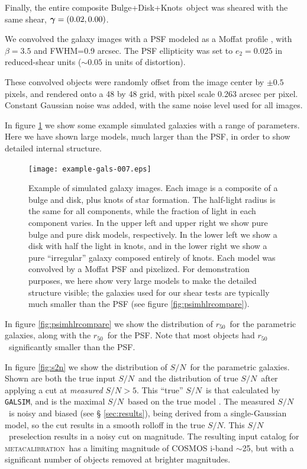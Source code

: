 \documentclass[iop]{emulateapj}
\newcommand{\snr}{$S/N$}
\newcommand{\hlr}{$r_{50}$}
\newcommand{\vecg}{\mbox{\boldmath $\gamma$}}
\newcommand{\mcal}{\textsc{metacalibration}}
\newcommand{\bdkfull}{Bulge+Disk+Knots}
\newcommand{\galsim}{\texttt{GALSIM}}
\begin{document}
Finally, the entire composite \bdkfull\ object was sheared with the same
shear, $\vecg = (0.02, 0.00)$.

We convolved the galaxy images with a PSF modeled as a Moffat profile
\citep{Moffat1969}, with $\beta=3.5$ and FWHM=0.9 arcsec. The PSF ellipticity
was set to $e_2 = 0.025$ in reduced-shear units ($\sim0.05$ in units of
distortion). 

These convolved objects were randomly offset from the image center by $\pm 0.5$
pixels, and rendered onto a 48 by 48 grid, with pixel scale 0.263 arcsec per
pixel. Constant Gaussian noise was added, with the same noise level used for
all images. 

In figure \ref{fig:parametricgals} we show some example simulated galaxies with
a range of parameters.  Here we have shown large models, much larger than the
PSF, in order to show detailed internal structure.

\begin{figure}[p]
    \centering
    \texttt{[image: example-gals-007.eps]}

    \caption{Example of simulated galaxy images.  Each image is a composite of a
    bulge and disk, plus knots of star formation.  The half-light radius is the
    same for all components, while the fraction of light in each component
    varies.  In the upper left and upper right we show pure bulge and pure disk
    models, respectively.  In the lower left we show a disk with half the light
    in knots, and in the lower right we show a pure ``irregular'' galaxy
    composed entirely of knots.  Each model was convolved by a Moffat PSF
	and pixelized.  For demonstration purposes, we here show very
    large models to make the detailed structure visible; the galaxies used for
    our shear tests are typically much smaller than the PSF (see figure
	\ref{fig:psimhlrcompare}). }

	\label{fig:parametricgals}

\end{figure}

In figure \ref{fig:psimhlrcompare} we show the distribution of \hlr\ for the
parametric galaxies, along with the \hlr\ for the PSF.  Note that most objects
had \hlr\ significantly smaller than the PSF.

In figure \ref{fig:s2n} we show the distribution of \snr\ for the parametric
galaxies.   Shown are both the true input \snr\ and the distribution of true
\snr\ after applying a cut at {\it measured} \snr$ > 5$.  This ``true'' \snr\
is that calculated by \galsim, and is the maximal \snr\ based on the true model
\citep{Jarvis2016}.  The measured \snr\ is noisy and biased (see \S
\ref{sec:results}), being derived from a single-Gaussian model, so the cut
results in a smooth rolloff in the true \snr.  This \snr\ preselection results
in a noisy cut on magnitude.  The resulting input catalog for \mcal\ has a
limiting magnitude of COSMOS i-band $\sim$25, but with a significant number
of objects removed at brighter magnitudes.
\end{document}
